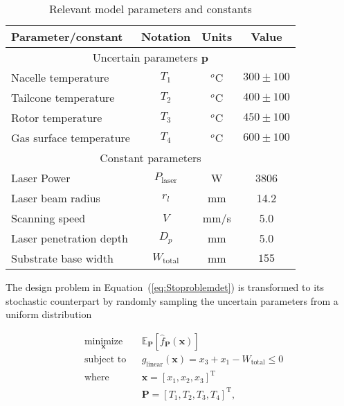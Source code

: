 \begin{table}[h!]
	\centering
	\renewcommand{\arraystretch}{1.0}%
	\small\addtolength{\tabcolsep}{-2pt}
	\caption{Relevant model parameters and constants}
	\label{table:STOmodelparameters}
	\begin{tabular}{lccc}
	\hline\hline
	\bf Parameter/constant & \bf Notation & \bf Units & \bf Value \\
	\hline
    \multicolumn{4}{c}{Uncertain parameters $\mathbf{p}$} \\ 
	Nacelle temperature & $T_1$ & $^{o}$C & $300 \pm 100$ \\ 
	Tailcone temperature & $T_2$ & $^{o}$C & $400 \pm 100$ \\ 
	Rotor temperature & $T_3$ & $^{o}$C & $450 \pm 100$ \\ 
	Gas surface temperature & $T_4$ & $^{o}$C & $600 \pm 100$ \\ \hline
    \multicolumn{4}{c}{Constant parameters} \\
	Laser Power & ${P_\textrm{laser}}$ & W &  3806 \\ 
	Laser beam radius & ${r_l}$ & mm & 14.2 \\ 
	Scanning speed& ${V}$ & mm/s & 5.0 \\ 
	Laser penetration depth & $D_p$ & mm & 5.0 \\
	Substrate base width & $W_{\textrm{total}}$ & mm & $155$ \\
	\hline\hline
	\end{tabular}
\end{table}

The design problem in Equation~(\ref{eq:Stoproblemdet}) is transformed to its stochastic counterpart by randomly sampling the uncertain parameters from a uniform distribution

\begin{equation}
	\begin{aligned}
		& \underset{\mathbf{x}}{\text{minimize}}
		& & \mathbb{E}_{\mathbf{P}}\left[\hat{f}_{\mathbf{P}}(\mathbf{x})\right]\\
		& \text{subject to}
		& & {g_{\textrm{linear}}}(\mathbf{x}) = x_3 + x_1 - W_{\textrm{total}} \le 0\\
        & \text{where}
        & & \mathbf{x} = \left[x_1,x_2,x_3\right]^{\textrm{T}}\\
        & & & \mathbf{P} = \left[T_1,T_2,T_3,T_4\right]^{\textrm{T}},\\
	\end{aligned}
	\label{eq:STOproblemsto}
\end{equation}

